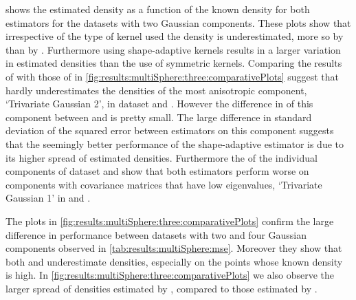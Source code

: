 	\begin{figure*}
		\centering
		
		\caption{Plots of the true versus estimated density of datasets \ferdosiTwo and \baakmanTwo for the shape-adaptive and the symmetric Modified Breiman Estimator.}
		\label{fig:results:multiSphere:two:comparativePlots}
	\end{figure*}
	 shows the estimated density as a function of the known density for both estimators for the datasets with two Gaussian components. These plots show that irrespective of the type of kernel used the density is underestimated, more so by \mbe than by \sambe. Furthermore using shape-adaptive kernels results in a larger variation in estimated densities than the use of symmetric kernels. 
		Comparing the results of \sambe with those of \mbe in \cref{fig:results:multiSphere:three:comparativePlots} suggest that \sambe hardly underestimates the densities of the most anisotropic component, \ie `Trivariate Gaussian 2', in dataset \ferdosiTwo and \baakmanTwo. However the difference in \mse of this component between \mbe and \sambe is pretty small. The large difference in standard deviation of the squared error between estimators on this component suggests that the seemingly better performance of the shape-adaptive estimator is due to its higher spread of estimated densities.
		Furthermore the \mses of the individual components of dataset \ferdosiTwo and \baakmanThree show that both estimators perform worse on components with covariance matrices that have low eigenvalues, \eg `Trivariate Gaussian 1' in \ferdosiTwo and \baakmanThree.
	\begin{figure*}
		\centering
		
		\caption{The estimated density as a function of the true density for dataset \ferdosiThree and \baakmanThree, for both \mbe and \sambe.}
		\label{fig:results:multiSphere:three:comparativePlots}
	\end{figure*}
	The plots in \cref{fig:results:multiSphere:three:comparativePlots} confirm the large difference in performance between datasets with two and four Gaussian components observed in \cref{tab:results:multiSphere:mse}. Moreover they show that both \mbe and \sambe underestimate densities, especially on the points whose known density is high. In \cref{fig:results:multiSphere:three:comparativePlots} we also observe the larger spread of densities estimated by \sambe, compared to those estimated by \mbe.

